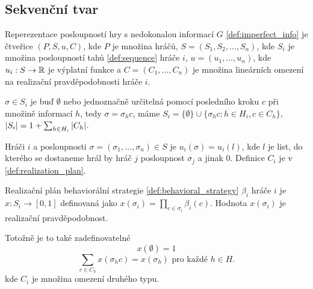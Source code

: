 \subsection{Sekvenční tvar}
\begin{definition}\label{def:sequence_form}
  Reperezentace posloupností hry s nedokonalou informací $G$ \ref{def:imperfect_info} je čtveřice $(P,S,u,C)$, kde $P$ je množina hráčů, $S=(S_1,S_2, \dots,S_n)$, kde $S_i$ je množina posloupností tahů \ref{def:sequence} hráče $i$, $u= (u_1,\dots,u_n)$, kde $u_i : S \rightarrow \mathbb{R}$ je výplatní funkce a $C = (C_1,\dots,C_n)$ je množina lineárních omezení na realizační pravděpodobnosti hráče $i$. 

  $\sigma \in S_i$ je buď $\emptyset$ nebo jednoznačně určitelná pomocí posledního kroku $c$ při množině informací $h$, tedy $\sigma = \sigma_h c$, máme $S_i = \{\emptyset\} \cup \{\sigma_hc:h \in H_i, c\in C_h\}$, $\left|S_i\right| = 1+ \sum_{h \in H_i} \left|C_h\right|$. 

  Hráči $i$ a posloupnosti $\sigma = (\sigma_1, \dots, \sigma_n) \in S$ je $u_i(\sigma) = u_i(l)$, kde $l$ je list, do kterého se dostaneme hrál by hráč $j$ posloupnost $\sigma_j$ a jinak 0. 
    Definice $C_i$ je v \ref{def:realization_plan}. 
\end{definition}
\begin{definition}\label{def:realization_plan} 
    Realizační plán behaviorální strategie \ref{def:behavioral_strategy} $\beta_i$ hráče $i$ je $x: S_i \rightarrow [0,1]$ definovaná jako $x(\sigma_i)= \prod_{c\in \sigma_i} \beta_i(c)$. 
    Hodnota $x(\sigma_i)$ je realizační pravděpodobnost. 

    Totožně je to také zadefinovatelné 
    \[
        x(\emptyset) = 1 
    \]
    \[
        \sum_{c\in C_h} x(\sigma_hc) = x(\sigma_h) \text{ pro každé } h\in H. 
    \]
    kde $C_i$ je množina omezení druhého typu. 
\end{definition}
